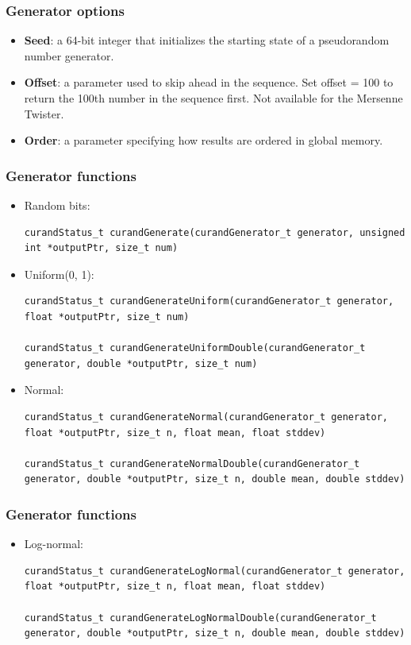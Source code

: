 \documentclass[handout]{beamer}
\numberwithin{equation}{section}
\begin{document}
\begin{frame}
\frametitle{Generator options}
\begin{itemize}
\item {\bf Seed}: a 64-bit integer that initializes the starting state of a pseudorandom number generator.
\pause \item {\bf Offset}: a parameter used to skip ahead in the sequence. Set offset = 100 to return the 100th number in the sequence first. Not available for the Mersenne Twister.
\pause \item {\bf Order}: a parameter specifying how results are ordered in global memory.
\end{itemize}
\end{frame}

\begin{frame}[fragile]
\frametitle{Generator functions}
\begin{itemize}
\item Random bits:
\lstset{basicstyle=\tiny}
\begin{lstlisting}
curandStatus_t curandGenerate(curandGenerator_t generator, unsigned int *outputPtr, size_t num)
\end{lstlisting}

\pause \item Uniform(0, 1):
\begin{lstlisting}
curandStatus_t curandGenerateUniform(curandGenerator_t generator, float *outputPtr, size_t num)

curandStatus_t curandGenerateUniformDouble(curandGenerator_t generator, double *outputPtr, size_t num)
\end{lstlisting}

\pause \item Normal:
\begin{lstlisting}
curandStatus_t curandGenerateNormal(curandGenerator_t generator, float *outputPtr, size_t n, float mean, float stddev)

curandStatus_t curandGenerateNormalDouble(curandGenerator_t generator, double *outputPtr, size_t n, double mean, double stddev)
\end{lstlisting}
\end{itemize}
\end{frame}


\begin{frame}[fragile]
\frametitle{Generator functions} \lstset{basicstyle=\tiny}
\begin{itemize}

\item Log-normal:
\begin{lstlisting}
curandStatus_t curandGenerateLogNormal(curandGenerator_t generator, float *outputPtr, size_t n, float mean, float stddev)

curandStatus_t curandGenerateLogNormalDouble(curandGenerator_t generator, double *outputPtr, size_t n, double mean, double stddev)
\end{lstlisting}
\end{itemize}
\end{frame}
\end{document}
